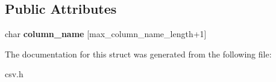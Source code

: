 \subsection*{Public Attributes}
\begin{DoxyCompactItemize}
\item 
char {\bfseries column\+\_\+name} [max\+\_\+column\+\_\+name\+\_\+length+1]\label{structio_1_1error_1_1with__column__name_af40ba00f1f035d363b099baf1f724323}

\end{DoxyCompactItemize}


The documentation for this struct was generated from the following file\+:\begin{DoxyCompactItemize}
\item 
csv.\+h\end{DoxyCompactItemize}
